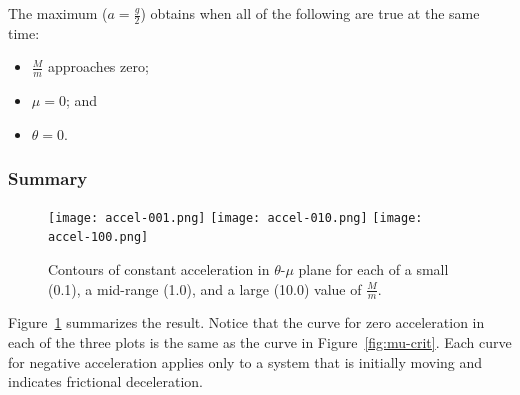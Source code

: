 \documentclass[twocolumn]{article}
\begin{document}
The maximum ($a = \tfrac{g}{2}$) obtains when all of the following are true at
the same time:
\begin{itemize}
   \item $\tfrac{M}{m}$ approaches zero;
   \item $\mu = 0$; and
   \item $\theta = 0$.
\end{itemize}

\subsubsection{Summary}

\begin{figure}
   \texttt{[image: accel-001.png]}
   \texttt{[image: accel-010.png]}
   \texttt{[image: accel-100.png]}
   \caption{Contours of constant acceleration in $\theta$-$\mu$ plane for each
      of a small (0.1), a mid-range (1.0), and a large (10.0) value of
      $\tfrac{M}{m}$.}
   \label{fig:accel}
\end{figure}

Figure~\ref{fig:accel} summarizes the result. Notice that the curve for zero
acceleration in each of the three plots is the same as the curve in
Figure~\ref{fig:mu-crit}. Each curve for negative acceleration applies only to
a system that is initially moving and indicates frictional deceleration.

\newpage


\end{document}
